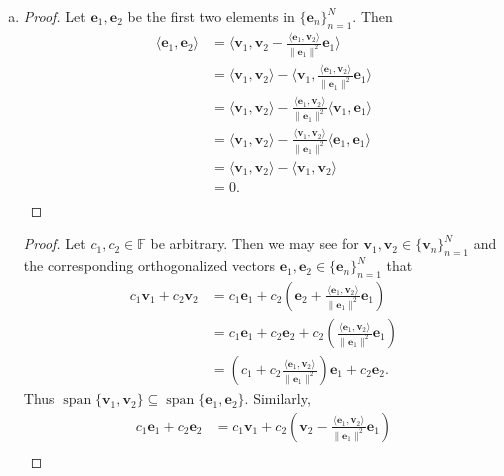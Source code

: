 \documentclass[12pt]{amsart}
\newcommand{\1}{\mathbbm{1}}
\numberwithin{equation}{section}
\numberwithin{Theorem}{section}
\theoremstyle{plain} %
\theoremstyle{definition}
\theoremstyle{remark}
\begin{document}
\begin{enumerate}[1.]
\begin{enumerate}[(a)]
	\item 
	\begin{proof}
		Let \(\mathbf{e}_1,\mathbf{e}_2\) be the first two elements in \(\{\mathbf{e}_{n}\}_{n=1}^{N}\). Then	
	\begin{align*}
		\langle \mathbf{e}_1,\mathbf{e}_2 \rangle
		&= \langle \mathbf{v}_1, \mathbf{v}_2 - \frac{\langle\mathbf{e}_1,\mathbf{v}_2\rangle}{\|\mathbf{e}_1\|^2}\mathbf{e}_1 \rangle  \\
		&= \langle \mathbf{v}_1, \mathbf{v}_2 \rangle - \langle \mathbf{v}_1, \frac{\langle\mathbf{e}_1,\mathbf{v}_2\rangle}{\|\mathbf{e}_1\|^2}\mathbf{e}_1 \rangle  \\
		&= \langle \mathbf{v}_1, \mathbf{v}_2 \rangle - \frac{\langle\mathbf{e}_1,\mathbf{v}_2\rangle}{\|\mathbf{e}_1\|^2} \langle \mathbf{v}_1, \mathbf{e}_1 \rangle  \\
		&= \langle \mathbf{v}_1, \mathbf{v}_2 \rangle - \frac{\langle\mathbf{v}_1,\mathbf{v}_2\rangle}{\|\mathbf{e}_1\|^2} \langle \mathbf{e}_1, \mathbf{e}_1 \rangle  \\
		&= \langle \mathbf{v}_1, \mathbf{v}_2 \rangle - 
		\langle\mathbf{v}_1,\mathbf{v}_2\rangle   \\
		&= 0.  \\
	\end{align*}
	\end{proof}
	\begin{proof}
		Let \(c_1, c_2 \in\mathbb{F}\) be arbitrary. Then we may see for \(\mathbf{v}_1,\mathbf{v}_2 \in \{\mathbf{v}_{n}\}_{n=1}^{N}\) and the corresponding orthogonalized vectors \(\mathbf{e}_1,\mathbf{e}_2 \in\{\mathbf{e}_{n}\}_{n=1}^{N}\) that
		\begin{align*}
			c_1\mathbf{v}_1+c_2\mathbf{v}_2
			&= c_1\mathbf{e}_1+c_2\left( \mathbf{e}_2 + \frac{\langle\mathbf{e}_1,\mathbf{v}_2\rangle}{\|\mathbf{e}_1\|^2}\mathbf{e}_1 \right) \\
			&= c_1\mathbf{e}_1+ c_2\mathbf{e}_2 + c_2\left( \frac{\langle\mathbf{e}_1,\mathbf{v}_2\rangle}{\|\mathbf{e}_1\|^2}\mathbf{e}_1 \right) \\
			&= \left(c_1 + c_2 \frac{\langle\mathbf{e}_1,\mathbf{v}_2\rangle}{\|\mathbf{e}_1\|^2} \right)\mathbf{e}_1 + c_2\mathbf{e}_2.
		\end{align*}
		Thus \(\operatorname{span}\{\mathbf{v}_{1},\mathbf{v}_{2}\} \subseteq \operatorname{span}\{\mathbf{e}_{1},\mathbf{e}_{2}\}\). Similarly, 
		\begin{align*}
			c_1\mathbf{e}_1+c_2\mathbf{e}_2
			&= c_1\mathbf{v}_1+c_2\left( \mathbf{v}_2 - \frac{\langle\mathbf{e}_1,\mathbf{v}_2\rangle}{\|\mathbf{e}_1\|^2}\mathbf{e}_1 \right) \\

\end{align*}
\end{proof}
\end{enumerate}
\end{enumerate}
\end{document}
